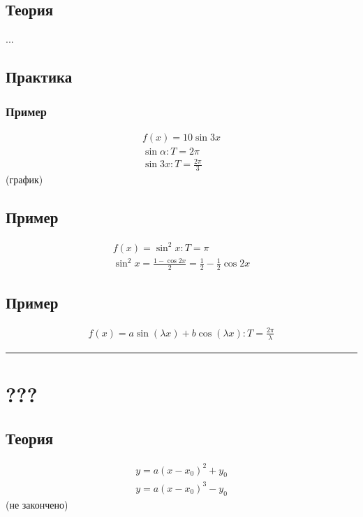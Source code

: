 \documentclass{article}
\begin{document}
\subsection{Теория}
...


\subsection{Практика}

\subsubsection{Пример}
\begin{gather*}
    f(x) = 10 \sin 3x \\
    \sin \alpha: T = 2\pi \\
    \sin 3x: T = \frac{2\pi}{3}
\end{gather*}
(график)

\subsection{Пример}
\begin{gather*}
    f(x) = \sin^2 x: T = \pi \\
    \sin^2 x = \frac{1 - \cos 2x}{2} = \frac{1}{2} - \frac{1}{2} \cos 2x     
\end{gather*}

\subsection{Пример}
\begin{gather*}
    f(x) = a \sin(\lambda x) + b \cos(\lambda x): T = \frac{2 \pi}{\lambda}
\end{gather*}



\par\noindent\rule{\textwidth}{1pt}
\section{???}

\subsection{Теория}
\begin{gather*}
    y = a(x - x_0)^2 + y_0 \\
    y = a(x - x_0)^3 - y_0
\end{gather*}
(не закончено)
\end{document}
